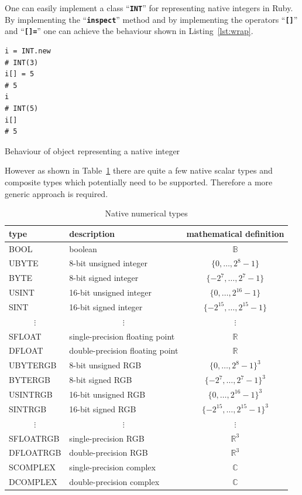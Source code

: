 \documentclass[10pt,journal,compsoc]{joser1}
\newcommand{\code}[1]{``\texttt{\textbf{\textcolor{codegray}{\small{#1}}}}''}
\newcommand{\tbl}[1]{Table~\ref{tbl:#1}}
\newcommand{\lst}[1]{Listing~\ref{lst:#1}}
\begin{document}
One can easily implement a class \code{INT} for representing native integers in
Ruby\citep{w2009}. By implementing the \code{inspect} method and by
implementing the operators \code{[]} and \code{[]=} one can achieve the
behaviour shown in \lst{wrap}.
\begin{listing}[htbp]
  \begin{verbatim}
i = INT.new
# INT(3)
i[] = 5
# 5
i
# INT(5)
i[]
# 5
  \end{verbatim}
  \caption{Behaviour of object representing a native integer\label{lst:wrap}}
\end{listing}
However as shown in \tbl{scalars} there are quite a few native scalar types and
composite types which potentially need to be supported. Therefore a more
generic approach is required.
\begin{table}[htbp]
  \begin{center}
    \caption{Native numerical types\label{tbl:scalars}}
    \begin{tabular}{llc}\toprule
    \textbf{type} &
    \textbf{description} &
    \parbox[t]{.2\columnwidth}{\textbf{mathematical definition}}\\\midrule
    BOOL     & boolean                 & $\mathbb{B}$\\
    UBYTE    & 8-bit unsigned integer  & $\{0,\ldots,2^8-1\}$\\
    BYTE     & 8-bit signed integer    & $\{-2^7,\ldots,2^7-1\}$\\
    USINT    & 16-bit unsigned integer & $\{0,\ldots,2^{16}-1\}$\\
    SINT     & 16-bit signed integer   & $\{-2^{15},\ldots,2^{15}-1\}$\\
     &  & $\vdots$\\
    SFLOAT    & single-precision floating point & $\mathbb{R}$\\
    DFLOAT    & double-precision floating point & $\mathbb{R}$\\
    UBYTERGB & 8-bit unsigned RGB      & $\{0,\ldots,2^8-1\}^3$\\
    BYTERGB  & 8-bit signed RGB        & $\{-2^7,\ldots,2^7-1\}^3$\\
    USINTRGB & 16-bit unsigned RGB     & $\{0,\ldots,2^{16}-1\}^3$\\
    SINTRGB  & 16-bit signed RGB       & $\{-2^{15},\ldots,2^{15}-1\}^3$\\
     &  & $\vdots$\\
    SFLOATRGB & single-precision RGB   & $\mathbb{R}^3$\\
    DFLOATRGB & double-precision RGB   & $\mathbb{R}^3$\\
    SCOMPLEX  & single-precision complex & $\mathbb{C}$\\
    DCOMPLEX  & double-precision complex & $\mathbb{C}$\\\bottomrule
    \end{tabular}
  \end{center}
\end{table}
\end{document}

